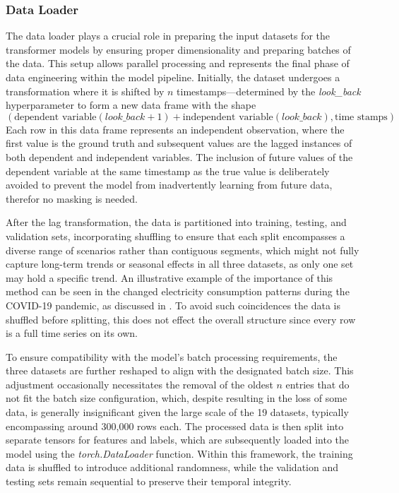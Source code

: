 \documentclass{article}
\begin{document}
\subsubsection{Data Loader}

The data loader plays a crucial role in preparing the input datasets for the transformer models by ensuring proper dimensionality and preparing batches of the data. This setup allows parallel processing and represents the final phase of data engineering within the model pipeline. Initially, the dataset undergoes a transformation where it is shifted by $n$ timestamps—determined by the \textit{look\_back} hyperparameter to form a new data frame with the shape 
\begin{equation*}
    (\text{dependent variable}(look\_back + 1) + \text{independent variable}(look\_back), \text{time stamps})
\end{equation*}
Each row in this data frame represents an independent observation, where the first value is the ground truth and subsequent values are the lagged instances of both dependent and independent variables. The inclusion of future values of the dependent variable at the same timestamp as the true value is deliberately avoided to prevent the model from inadvertently learning from future data, therefor no masking is needed.

After the lag transformation, the data is partitioned into training, testing, and validation sets, incorporating shuffling to ensure that each split encompasses a diverse range of scenarios rather than contiguous segments, which might not fully capture long-term trends or seasonal effects in all three datasets, as only one set may hold a specific trend. An illustrative example of the importance of this method can be seen in the changed electricity consumption patterns during the COVID-19 pandemic, as discussed in \cite{COVID_electric_consumption}. To avoid such coincidences the data is shuffled before splitting, this does not effect the overall structure since every row is a full time series on its own.

To ensure compatibility with the model's batch processing requirements, the three datasets are further reshaped to align with the designated batch size. This adjustment occasionally necessitates the removal of the oldest $n$ entries that do not fit the batch size configuration, which, despite resulting in the loss of some data, is generally insignificant given the large scale of the 19 datasets, typically encompassing around 300,000 rows each. The processed data is then split into separate tensors for features and labels, which are subsequently loaded into the model using the \textit{torch.DataLoader} function. Within this framework, the training data is shuffled to introduce additional randomness, while the validation and testing sets remain sequential to preserve their temporal integrity.
\end{document}
